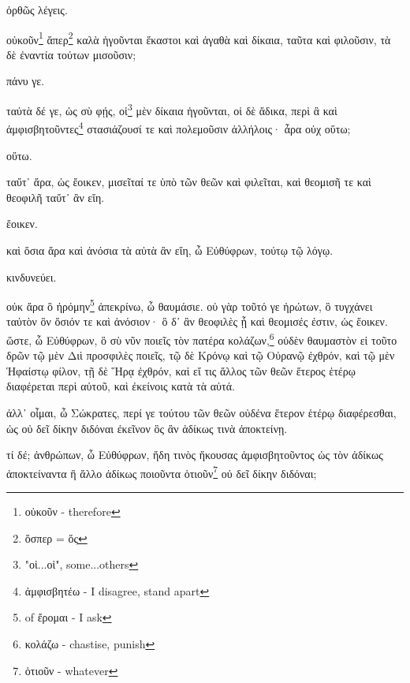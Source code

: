 ὀρθῶς
λέγεις.

οὐκοῦν\footnote{οὐκοῦν - therefore}
ἅπερ\footnote{ὅσπερ = ὅς}
καλὰ
ἡγοῦνται
ἕκαστοι
καὶ
ἀγαθὰ
καὶ
δίκαια,
ταῦτα
καὶ
φιλοῦσιν,
τὰ
δὲ
ἐναντία
τούτων
μισοῦσιν;

πάνυ
γε.

ταὐτὰ
δέ
γε,
ὡς
σὺ
φῄς,
οἱ\footnote{"οἱ...οἱ", some...others}
μὲν
δίκαια
ἡγοῦνται,
\versification{[8a]}
οἱ
δὲ
ἄδικα,
περὶ
ἃ
καὶ
ἀμφισβητοῦντες\footnote{ἀμφισβητέω - I disagree, stand apart}
στασιάζουσί
τε
καὶ
πολεμοῦσιν
ἀλλήλοις·
ἆρα
οὐχ
οὕτω;






οὕτω.

ταὔτ᾽
ἄρα,
ὡς
ἔοικεν,
μισεῖταί
τε
ὑπὸ
τῶν
θεῶν
καὶ
φιλεῖται,
καὶ
θεομισῆ
τε
καὶ
θεοφιλῆ
ταὔτ᾽
ἂν
εἴη.

ἔοικεν.

καὶ
ὅσια
ἄρα
καὶ
ἀνόσια
τὰ
αὐτὰ
ἂν
εἴη,
ὦ
Εὐθύφρων,
τούτῳ
τῷ
λόγῳ.

κινδυνεύει.

οὐκ
ἄρα
ὃ
ἠρόμην\footnote{ of ἔρομαι - I ask}
ἀπεκρίνω,
ὦ
θαυμάσιε.
οὐ
γὰρ
τοῦτό
γε
ἠρώτων,
ὃ
τυγχάνει
ταὐτὸν
ὂν
ὅσιόν
τε
καὶ
ἀνόσιον·
ὃ
δ᾽
ἂν
θεοφιλὲς
ᾖ
καὶ
θεομισές
ἐστιν,
ὡς
ἔοικεν.
\versification{[8b]}
ὥστε,
ὦ
Εὐθύφρων,
ὃ
σὺ
νῦν
ποιεῖς
τὸν
πατέρα
κολάζων,\footnote{κολάζω - chastise, punish}
οὐδὲν
θαυμαστὸν
εἰ
τοῦτο
δρῶν
τῷ
μὲν
Διὶ
προσφιλὲς
ποιεῖς,
τῷ
δὲ
Κρόνῳ
καὶ
τῷ
Οὐρανῷ
ἐχθρόν,
καὶ
τῷ
μὲν
Ἡφαίστῳ
φίλον,
τῇ
δὲ
Ἥρᾳ
ἐχθρόν,
καὶ
εἴ
τις
ἄλλος
τῶν
θεῶν
ἕτερος
ἑτέρῳ
διαφέρεται
περὶ
αὐτοῦ,
καὶ
ἐκείνοις
κατὰ
τὰ
αὐτά.

ἀλλ᾽
οἶμαι,
ὦ
Σώκρατες,
περί
γε
τούτου
τῶν
θεῶν
οὐδένα
ἕτερον
ἑτέρῳ
διαφέρεσθαι,
ὡς
οὐ
δεῖ
δίκην
διδόναι
ἐκεῖνον
ὃς
ἂν
ἀδίκως
τινὰ
ἀποκτείνῃ.

τί
δέ;
ἀνθρώπων,
ὦ
Εὐθύφρων,
ἤδη
τινὸς
ἤκουσας
\versification{[8c]}
ἀμφισβητοῦντος
ὡς
τὸν
ἀδίκως
ἀποκτείναντα
ἢ
ἄλλο
ἀδίκως
ποιοῦντα
ὁτιοῦν\footnote{ὁτιοῦν - whatever}
οὐ
δεῖ
δίκην
διδόναι;











